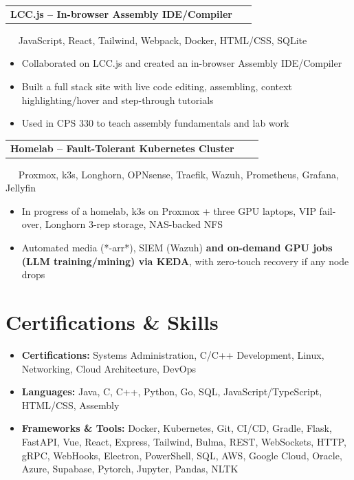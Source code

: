 \documentclass[letterpaper,11pt]{article}
\makeatletter
\newcommand{\resumeItem}[1]{\item\scriptsize{#1}}
\newcommand{\resumeProjectHeading}[4]{
  \vspace{-2pt}\item
  \begin{tabular*}{0.97\textwidth}{l@{\extracolsep{\fill}}r}
    \textbf{#1} \href{#4}{\faLink} & {\Large #2} \\
  \end{tabular*}\vspace{-2pt}
  {\small\faDatabase\ \hspace{-0.15in} {\tiny #3}}\\[-10pt]
}
\newcommand{\resumeSubHeadingListStart}{\begin{itemize}[label={},parsep=0pt]}
\newcommand{\resumeSubHeadingListEnd}{\end{itemize}}
\makeatother
\begin{document}
  \resumeProjectHeading{LCC.js -- In-browser Assembly IDE/Compiler}{\faJs\ \faDocker}{\faToolbox\ JavaScript, React, Tailwind, Webpack, Docker, HTML/CSS, SQLite}{https://hydra.newpaltz.edu/lccjs}
    \begin{itemize}
      \resumeItem{Collaborated on LCC.js and created an in-browser Assembly IDE/Compiler}
      \resumeItem{Built a full stack site with live code editing, assembling, context highlighting/hover and step-through tutorials}
      \resumeItem{Used in CPS 330 to teach assembly fundamentals and lab work}
    \end{itemize}

  \resumeProjectHeading{Homelab -- Fault-Tolerant Kubernetes Cluster}{\faNetworkWired\ \faDocker\ \faLinux}{\faToolbox\ Proxmox, k3s, Longhorn, OPNsense, Traefik, Wazuh, Prometheus, Grafana, Jellyfin}{N/A}
    \begin{itemize}
      \resumeItem In progress of a homelab, k3s on Proxmox + three GPU laptops, VIP fail-over, Longhorn 3-rep storage, NAS-backed NFS
      \resumeItem Automated media (*-arr*), SIEM (Wazuh) \textbf{and on-demand GPU jobs (LLM training/mining) via KEDA}, with zero-touch recovery if any node drops
    \end{itemize}


\vspace{-8pt}
\section{Certifications \& Skills}
\resumeSubHeadingListStart
  \resumeItem{\textbf{Certifications:} Systems Administration, C/C++ Development, Linux, Networking, Cloud Architecture, DevOps}
  \resumeItem{\textbf{Languages:} Java, C, C++, Python, Go, SQL, JavaScript/TypeScript, HTML/CSS, Assembly}
  \resumeItem{\textbf{Frameworks \& Tools:} Docker, Kubernetes, Git, CI/CD, Gradle, Flask, FastAPI, Vue, React, Express, Tailwind, Bulma, REST, WebSockets, HTTP, gRPC, WebHooks, Electron, PowerShell, SQL, AWS, Google Cloud, Oracle, Azure, Supabase, Pytorch, Jupyter, Pandas, NLTK}
\resumeSubHeadingListEnd

\end{document}
